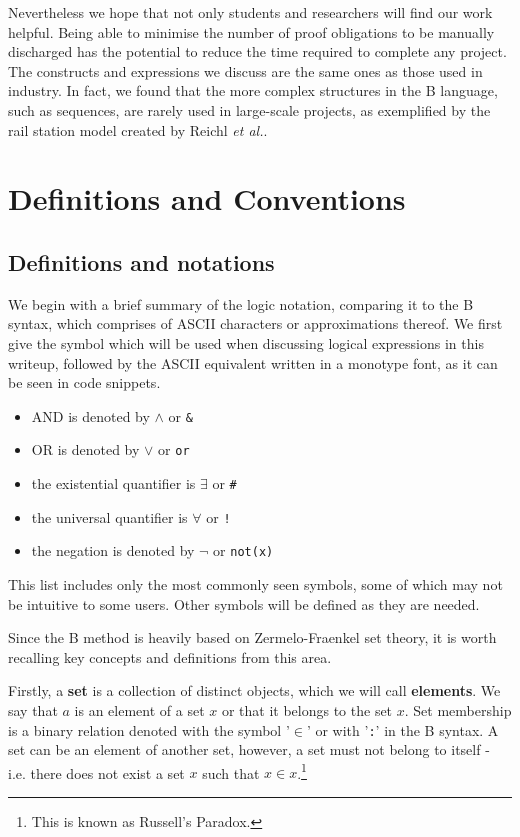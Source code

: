 \documentclass[12pt,journal,duplex]{IEEEtran}
\begin{document}
	Nevertheless we hope that not only students and researchers will find our work helpful. Being able to minimise the number of proof obligations to be manually discharged has the potential to reduce the time required to complete any project. The constructs and expressions we discuss are the same ones as those used in industry. In fact, we found that the more complex structures in the B language, such as sequences, are rarely used in large-scale projects, as exemplified by the rail station model created by Reichl \textit{et al.}\cite{station model}.
	\section{Definitions and Conventions}

	\subsection{Definitions and notations}
	We begin with a brief summary of the logic notation, comparing it to the B syntax, which comprises of ASCII characters or approximations thereof. We first give the symbol which will be used when discussing logical expressions in this writeup, followed by the ASCII equivalent written in a monotype font, as it can be seen in code snippets.
	\begin{itemize}
		\item AND is denoted by $\wedge$ or \texttt{\&}
		\item OR is denoted by $\vee$ or \texttt{or}
		\item the existential quantifier is $\exists$ or \texttt{\#}
		\item the universal quantifier is $\forall$ or \texttt{!}
		\item the negation is denoted by $\neg$ or \texttt{not(x)}
	\end{itemize}
	This list includes only the most commonly seen symbols, some of which may not be intuitive to some users. Other symbols will be defined as they are needed.

	Since the B method is heavily based on Zermelo-Fraenkel set theory, it is worth recalling key concepts and definitions from this area.\cite{Goldrei}

	Firstly, a \textbf{set} is a collection of distinct objects, which we will call \textbf{elements}. We say that $a$ is an element of a set $x$ or that it belongs to the set $x$. Set membership is a binary relation denoted with the symbol '$\in$' or with '\texttt{:}' in the B syntax. A set can be an element of another set, however, a set must not belong to itself - i.e. there does not exist a set $x$ such that $x \in x$.\footnote{This is known as Russell's Paradox.}
\end{document}
